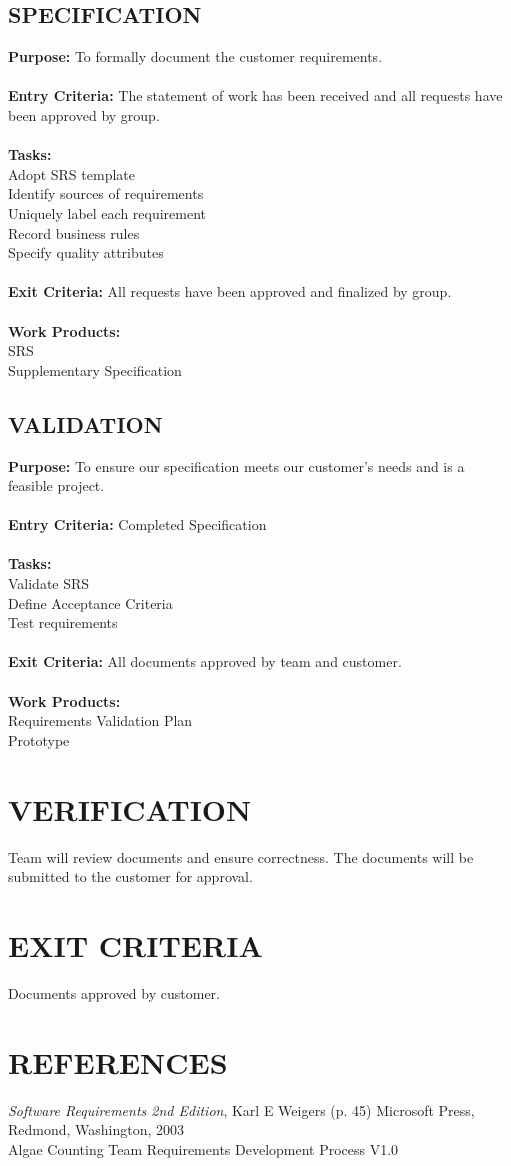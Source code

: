 \documentclass[11pt]{article}
\begin{document}
\subsection{SPECIFICATION}
\textbf{Purpose:} To formally document the customer requirements.\\
\\
\textbf{Entry Criteria:} The statement of work has been received and all requests have been approved by group. \\
\\
\textbf{Tasks:} \\
Adopt SRS template \\
Identify sources of requirements \\
Uniquely label each requirement \\
Record business rules \\
Specify quality attributes \\
\\
\textbf{Exit Criteria:} All requests have been approved and finalized by group. \\
\\
\textbf{Work Products:} \\
SRS \\
Supplementary Specification \\

\subsection{VALIDATION}
\textbf{Purpose:} To ensure our specification meets our customer's needs and is a feasible project. \\
\\
\textbf{Entry Criteria:} Completed Specification \\
\\
\textbf{Tasks:} \\
Validate SRS \\
Define Acceptance Criteria \\
Test requirements \\
\\
\textbf{Exit Criteria: } All documents approved by team and customer. \\
\\
\textbf{Work Products:} \\
Requirements Validation Plan \\
Prototype \\

\section{VERIFICATION}
Team will review documents and ensure correctness. The documents will be submitted to the customer for approval.

\section{EXIT CRITERIA}
Documents approved by customer.

\section{REFERENCES}
\textit{Software Requirements 2nd Edition}, Karl E Weigers (p. 45) Microsoft Press, Redmond, Washington, 2003
\\
Algae Counting Team Requirements Development Process V1.0
\end{document}
